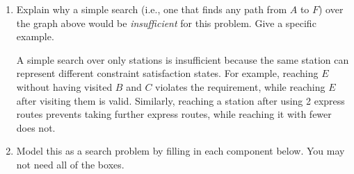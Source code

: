 \begin{enumerate}

\clearpage 
\item \points[2] Explain why a simple search (i.e., one that finds any path from $A$ to
$F$) over the graph above would be \emph{insufficient} for this problem.
Give a specific example.
\begin{solution}
A simple search over only stations is insufficient because the same station can represent different constraint satisfaction states. For example, reaching $E$ without having visited $B$ and $C$ violates the requirement, while reaching $E$ after visiting them is valid. Similarly, reaching a station after using 2 express routes prevents taking further express routes, while reaching it with fewer does not.
\end{solution}
\vspace{2cm}
\item \points[8] Model this as a search problem by filling in each component below. You may not need all of the boxes.
  \begin{enumerate}


\end{enumerate}
\end{enumerate}
